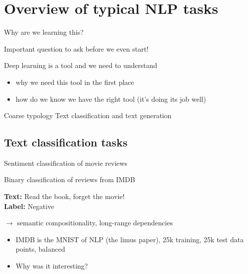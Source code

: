 \documentclass[12pt,aspectratio=169,handout]{beamer}
\begin{document}
\section{Overview of typical NLP tasks}


\begin{frame}{Why are we learning this?}
	
Important question to ask before we even start!

\bigskip

Deep learning is a tool and we need to understand

\begin{itemize}
	\item why we need this tool in the first place
	\item how do we know we have the right tool (it's doing its job well)
\end{itemize}


\end{frame}


\begin{frame}{Coarse typology}
Text classification and text generation
\end{frame}

\subsection{Text classification tasks}

\begin{frame}{ Sentiment classification of movie reviews}

Binary classification of reviews from IMDB

\begin{example}
	\textbf{Text:} Read the book, forget the movie! \\
	\textbf{Label:} Negative
\end{example}	

$\to$ semantic compositionality, long-range dependencies


\begin{itemize}
\item IMDB is the MNIST of NLP (the limus paper), 25k training, 25k test data points, balanced
\item Why was it interesting?
\end{itemize}

\end{frame}
\end{document}
